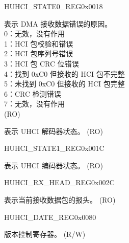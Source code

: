 \begin{register}{H}{UHCI\_STATE0\_REG}{0x0018}\label{regdesc:UHCISTATE0REG}
%
%
%
\regnewline%
\begin{regdesc}\begin{reglist}
\label{fielddesc:UHCIRXERRCAUSE}\item [UHCI\_RX\_ERR\_CAUSE] 表示 DMA 接收数据错误的原因。\\
0：无效，没有作用\\
1：HCI 包校验和错误\\
2：HCI 包序列号错误\\
3：HCI 包 CRC 位错误\\
4：找到 0xC0 但接收的 HCI 包不完整\\
5：未找到 0xC0 但接收的 HCI 包完整\\
6：CRC 检测错误\\
7：无效，没有作用\\(RO)
\label{fielddesc:UHCIDECODESTATE}\item [UHCI\_DECODE\_STATE] 表示 UHCI 解码器状态。 (RO)
\end{reglist}\end{regdesc}
\end{register}


\begin{register}{H}{UHCI\_STATE1\_REG}{0x001C}\label{regdesc:UHCISTATE1REG}
%
%
\regnewline%
\begin{regdesc}\begin{reglist}
\label{fielddesc:UHCIENCODESTATE}\item [UHCI\_ENCODE\_STATE] 表示 UHCI 编码器状态。 (RO)
\end{reglist}\end{regdesc}
\end{register}


\begin{register}{H}{UHCI\_RX\_HEAD\_REG}{0x002C}\label{regdesc:UHCIRXHEADREG}
%
\regnewline%
\begin{regdesc}\begin{reglist}
\label{fielddesc:UHCIRXHEAD}\item [UHCI\_RX\_HEAD] 表示当前接收数据包的报头。 (RO)
\end{reglist}\end{regdesc}
\end{register}


\begin{register}{H}{UHCI\_DATE\_REG}{0x0080}\label{regdesc:UHCIDATEREG}
%
\regnewline%
\begin{regdesc}\begin{reglist}
\label{fielddesc:UHCIDATE}\item [UHCI\_DATE] 版本控制寄存器。 (R/W)
\end{reglist}\end{regdesc}
\end{register}
